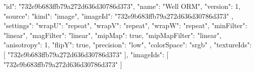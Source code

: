 {
  "id": "732e9b683ffb79a272d636d30786d373",
  "name": "Well ORM",
  "version": 1,
  "source": {
    "kind": "image",
    "imageId": "732e9b683ffb79a272d636d30786d373"
  },
  "settings": {
    "wrapU": "repeat",
    "wrapV": "repeat",
    "wrapW": "repeat",
    "minFilter": "linear",
    "magFilter": "linear",
    "mipMap": true,
    "mipMapFilter": "linear",
    "anisotropy": 1,
    "flipY": true,
    "precision": "low",
    "colorSpace": "srgb"
  },
  "textureIds": [
    "732e9b683ffb79a272d636d30786d373"
  ],
  "imageIds": [
    "732e9b683ffb79a272d636d30786d373"
  ]
}
